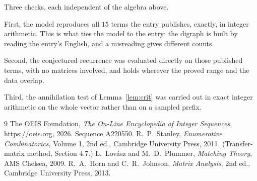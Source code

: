 \documentclass[11pt,a4paper]{article}
\theoremstyle{plain}
\theoremstyle{definition}
\begin{document}
Three checks, each independent of the algebra above.

First, the model reproduces all $15$ terms the entry publishes, exactly, in integer
arithmetic. This is what ties the model to the entry: the digraph is built by reading the
entry's English, and a misreading gives different counts.

Second, the conjectured recurrence was evaluated directly on those published terms, with no
matrices involved, and holds wherever the proved range and the data overlap.

Third, the annihilation test of Lemma~\ref{lem:crit} was carried out in exact integer
arithmetic on the whole vector rather than on a sampled prefix.

\begin{thebibliography}{9}
 The OEIS Foundation, \emph{The On-Line Encyclopedia of Integer
Sequences}, \url{https://oeis.org}, 2026. Sequence A220550.
 R.~P.~Stanley, \emph{Enumerative Combinatorics}, Volume 1, 2nd ed.,
Cambridge University Press, 2011. (Transfer-matrix method, Section 4.7.)
 L.~Lov\'asz and M.~D.~Plummer, \emph{Matching Theory}, AMS Chelsea,
2009.
 R.~A.~Horn and C.~R.~Johnson, \emph{Matrix Analysis}, 2nd ed., Cambridge
University Press, 2013.
\end{thebibliography}
\end{document}
